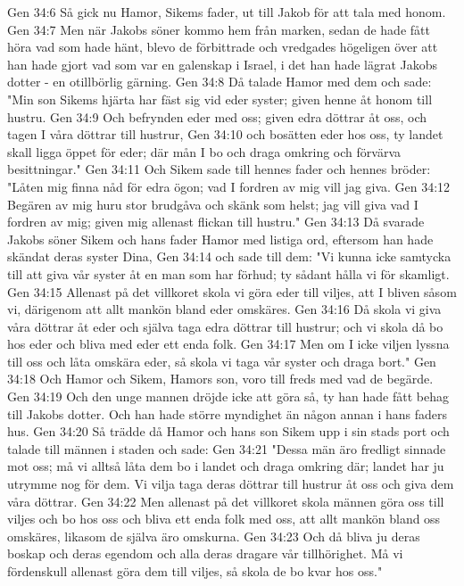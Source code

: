 Gen 34:6  Så gick nu Hamor, Sikems fader, ut till Jakob för att tala med honom.
Gen 34:7  Men när Jakobs söner kommo hem från marken, sedan de hade fått höra vad som hade hänt, blevo de förbittrade och vredgades högeligen över att han hade gjort vad som var en galenskap i Israel, i det han hade lägrat Jakobs dotter - en otillbörlig gärning.
Gen 34:8  Då talade Hamor med dem och sade: "Min son Sikems hjärta har fäst sig vid eder syster; given henne åt honom till hustru.
Gen 34:9  Och befrynden eder med oss; given edra döttrar åt oss, och tagen I våra döttrar till hustrur,
Gen 34:10  och bosätten eder hos oss, ty landet skall ligga öppet för eder; där mån I bo och draga omkring och förvärva besittningar."
Gen 34:11  Och Sikem sade till hennes fader och hennes bröder: "Låten mig finna nåd för edra ögon; vad I fordren av mig vill jag giva.
Gen 34:12  Begären av mig huru stor brudgåva och skänk som helst; jag vill giva vad I fordren av mig; given mig allenast flickan till hustru."
Gen 34:13  Då svarade Jakobs söner Sikem och hans fader Hamor med listiga ord, eftersom han hade skändat deras syster Dina,
Gen 34:14  och sade till dem: "Vi kunna icke samtycka till att giva vår syster åt en man som har förhud; ty sådant hålla vi för skamligt.
Gen 34:15  Allenast på det villkoret skola vi göra eder till viljes, att I bliven såsom vi, därigenom att allt mankön bland eder omskäres.
Gen 34:16  Då skola vi giva våra döttrar åt eder och själva taga edra döttrar till hustrur; och vi skola då bo hos eder och bliva med eder ett enda folk.
Gen 34:17  Men om I icke viljen lyssna till oss och låta omskära eder, så skola vi taga vår syster och draga bort."
Gen 34:18  Och Hamor och Sikem, Hamors son, voro till freds med vad de begärde.
Gen 34:19  Och den unge mannen dröjde icke att göra så, ty han hade fått behag till Jakobs dotter. Och han hade större myndighet än någon annan i hans faders hus.
Gen 34:20  Så trädde då Hamor och hans son Sikem upp i sin stads port och talade till männen i staden och sade:
Gen 34:21  "Dessa män äro fredligt sinnade mot oss; må vi alltså låta dem bo i landet och draga omkring där; landet har ju utrymme nog för dem. Vi vilja taga deras döttrar till hustrur åt oss och giva dem våra döttrar.
Gen 34:22  Men allenast på det villkoret skola männen göra oss till viljes och bo hos oss och bliva ett enda folk med oss, att allt mankön bland oss omskäres, likasom de själva äro omskurna.
Gen 34:23  Och då bliva ju deras boskap och deras egendom och alla deras dragare vår tillhörighet. Må vi fördenskull allenast göra dem till viljes, så skola de bo kvar hos oss."
